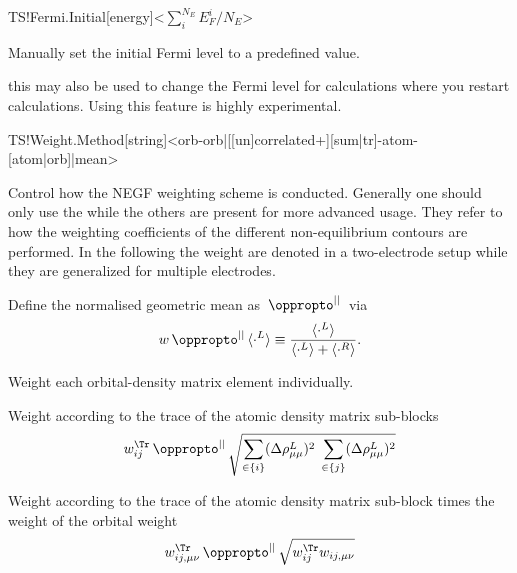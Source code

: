 \begin{fdfentry}{TS!Fermi.Initial}[energy]<$\sum^{N_E}_iE_F^i/N_E$>

  Manually set the initial Fermi level to a predefined value. 

  \note this may also be used to change the Fermi level for
  calculations where you restart calculations. Using this feature is
  highly experimental.
  
\end{fdfentry}

\begin{fdfentry}{TS!Weight.Method}[string]<orb-orb|[[un]correlated+][sum|tr]-atom-[atom|orb]|mean>
  
  Control how the NEGF weighting scheme is conducted. Generally one
  should only use the  while the others are present for
  more advanced usage. They refer to how the weighting coefficients of
  the different non-equilibrium contours are performed. In the
  following the weight are denoted in a two-electrode setup while they
  are generalized for multiple electrodes.

  \def\mypropto{\,\oppropto^{||}\,} %
  \def\mn{{\mu\nu}} %
  Define the normalised geometric mean as $\mypropto$ via
  \begin{equation}
    w\mypropto \langle\cdot^L\rangle\equiv
    \frac{\langle\cdot^L\rangle}{\langle\cdot^L\rangle+\langle\cdot^R\rangle}.
  \end{equation}


  \begin{fdfoptions}

    Weight each orbital-density matrix element individually.

    Weight according to the trace of the atomic density matrix sub-blocks
    \begin{equation}
      w_{ij}^{\Tr} \mypropto
      \sqrt{
          \sum_{\in\{i\}}(\Delta\rho_{\mu\mu}^L)^2
          \; %
          \sum_{\in\{j\}}(\Delta\rho_{\mu\mu}^L)^2
      }
    \end{equation}

    
    Weight according to the trace of the atomic density matrix
    sub-block times the weight of the orbital weight
    \begin{equation}
      w_{ij,\mn}^{\Tr} \mypropto
      \sqrt{
          w_{ij}^{\Tr} 
          w_{ij,\mn}
      }
    \end{equation}


\end{fdfoptions}
\end{fdfentry}
